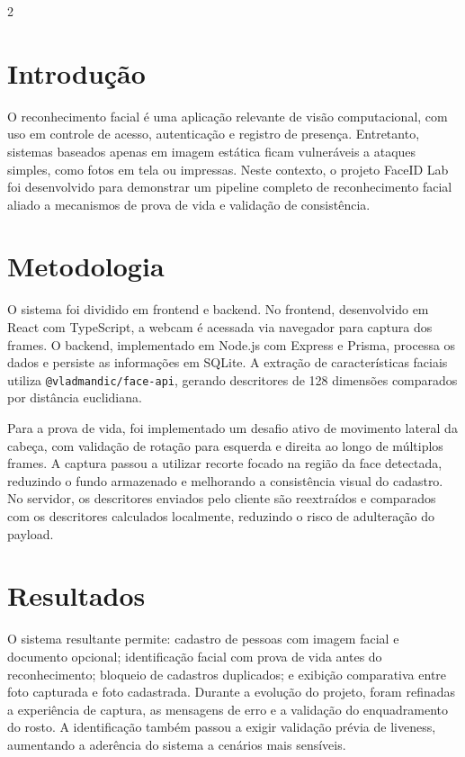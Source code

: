 \documentclass[10pt,a4paper]{article}
\begin{document}
\begin{multicols}{2}

\section{Introdu\c{c}\~ao}
O reconhecimento facial \'e uma aplica\c{c}\~ao relevante de vis\~ao computacional, com uso em controle de acesso, autentica\c{c}\~ao e registro de presen\c{c}a. Entretanto, sistemas baseados apenas em imagem est\'atica ficam vulner\'aveis a ataques simples, como fotos em tela ou impressas. Neste contexto, o projeto FaceID Lab foi desenvolvido para demonstrar um pipeline completo de reconhecimento facial aliado a mecanismos de prova de vida e valida\c{c}\~ao de consist\^encia.

\section{Metodologia}
O sistema foi dividido em frontend e backend. No frontend, desenvolvido em React com TypeScript, a webcam \'e acessada via navegador para captura dos frames. O backend, implementado em Node.js com Express e Prisma, processa os dados e persiste as informa\c{c}\~oes em SQLite. A extra\c{c}\~ao de caracter\'isticas faciais utiliza \texttt{@vladmandic/face-api}, gerando descritores de 128 dimens\~oes comparados por dist\^ancia euclidiana.

Para a prova de vida, foi implementado um desafio ativo de movimento lateral da cabe\c{c}a, com valida\c{c}\~ao de rota\c{c}\~ao para esquerda e direita ao longo de m\'ultiplos frames. A captura passou a utilizar recorte focado na regi\~ao da face detectada, reduzindo o fundo armazenado e melhorando a consist\^encia visual do cadastro. No servidor, os descritores enviados pelo cliente s\~ao reextra\'idos e comparados com os descritores calculados localmente, reduzindo o risco de adultera\c{c}\~ao do payload.

\section{Resultados}
O sistema resultante permite: cadastro de pessoas com imagem facial e documento opcional; identifica\c{c}\~ao facial com prova de vida antes do reconhecimento; bloqueio de cadastros duplicados; e exibi\c{c}\~ao comparativa entre foto capturada e foto cadastrada. Durante a evolu\c{c}\~ao do projeto, foram refinadas a experi\^encia de captura, as mensagens de erro e a valida\c{c}\~ao do enquadramento do rosto. A identifica\c{c}\~ao tamb\'em passou a exigir valida\c{c}\~ao pr\'evia de liveness, aumentando a ader\^encia do sistema a cen\'arios mais sens\'iveis.


\end{multicols}
\end{document}
